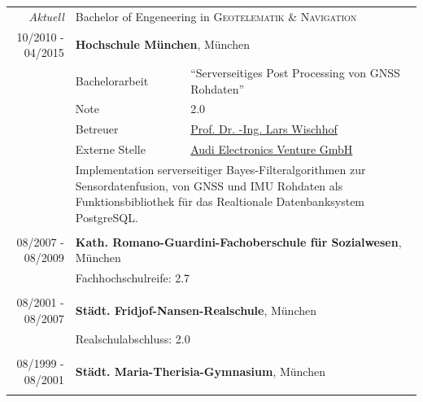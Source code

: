 \documentclass[a4paper,10pt]{article} %
\begin{document}
\begin{tabular}{r|l@{: }p{11cm}}
\emph{Aktuell} & \multicolumn{2}{p{11cm}}{Bachelor of Engeneering in \textsc{Geotelematik \& Navigation}}\\
\textsc{10/2010 - 04/2015} & \multicolumn{2}{p{11cm}}{\textbf{Hochschule München}, München} \\
                           & \small Bachelorarbeit & \small ``Serverseitiges Post Processing von GNSS Rohdaten'' \\
                           & \small Note           & \small 2.0\\
			   & \small Betreuer       & \small \href{mailto:lars.wischhof@hm.edu}{Prof. Dr. -Ing. Lars Wischhof}\\
                           & \small Externe Stelle & \small \href{http://www.audi-electronics-venture.de}{Audi Electronics Venture GmbH} \\
                           & \multicolumn{2}{p{11cm}}{\small Implementation serverseitiger Bayes-Filteralgorithmen zur Sensordatenfusion, von GNSS und IMU Rohdaten als Funktionsbibliothek für das Realtionale Datenbanksystem PostgreSQL.}\\
\multicolumn{3}{c}{}\\
 
 
\textsc{08/2007 - 08/2009} & \multicolumn{2}{p{11cm}}{\textbf{Kath. Romano-Guardini-Fachoberschule für Sozialwesen}, München} \\
                           & \multicolumn{2}{p{11cm}}{\small Fachhochschulreife: 2.7}                                         \\
\multicolumn{3}{c}{}                                                                                \\
 
 
\textsc{08/2001 - 08/2007} & \multicolumn{2}{p{11cm}}{\textbf{Städt. Fridjof-Nansen-Realschule}, München} \\
                           & \multicolumn{2}{p{11cm}}{\small Realschulabschluss: 2.0} \\
\multicolumn{3}{c}{}\\
 
 
\textsc{08/1999 - 08/2001} & \multicolumn{2}{p{11cm}}{\textbf{Städt. Maria-Therisia-Gymnasium}, München} \\
\multicolumn{3}{c}{}\\
\end{tabular}
 
\end{document}
